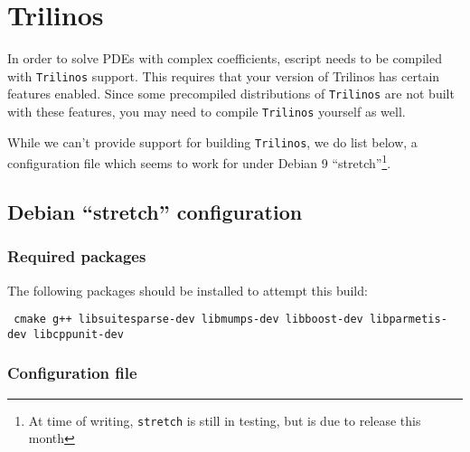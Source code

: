 \chapter{Trilinos}
\label{app:trilinos}

In order to solve PDEs with complex coefficients, escript needs to be compiled with \texttt{Trilinos} support.
This requires that your version of Trilinos has certain features enabled.
Since some precompiled distributions of \texttt{Trilinos} are not built with these features, you may 
need to compile \texttt{Trilinos} yourself as well.

While we can't provide support for building \texttt{Trilinos}, we do list below, a configuration file which seems to work for 
under Debian 9 ``stretch''\footnote{At time of writing, \texttt{stretch} is still in testing, but is due to release this month}.

\section{Debian ``stretch'' configuration}


\subsection{Required packages}

The following packages should be installed to attempt this build:

\texttt{ cmake g++ libsuitesparse-dev libmumps-dev libboost-dev libparmetis-dev libcppunit-dev
}



\subsection{Configuration file}

